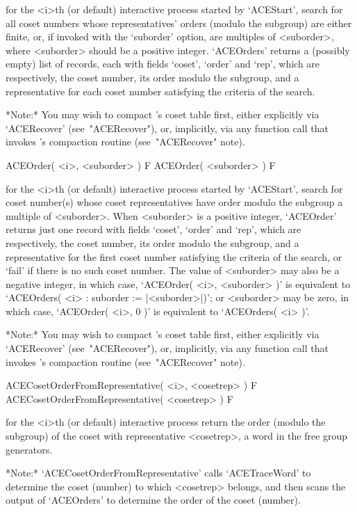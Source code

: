 for the <i>th (or  default)  interactive  {\ACE}  process  started  by
`ACEStart', search for all coset numbers whose representatives' orders
(modulo the subgroup) are either  finite,  or,  if  invoked  with  the
`suborder' option,  are  multiples  of  <suborder>,  where  <suborder>
should be a positive integer. `ACEOrders' returns a  (possibly  empty)
list of records, each with fields `coset', `order'  and  `rep',  which
are respectively, the coset number, its order modulo the subgroup, and
a representative for each coset number satisfying the criteria of  the
search.

*Note:*
You may wish to compact {\ACE}'s coset table first, either  explicitly
via `ACERecover' (see~"ACERecover"), or, implicitly, via any  function
call that invokes {\ACE}'s compaction routine (see~"ACERecover" note).

\>ACEOrder( <i>, <suborder> ) F
\>ACEOrder( <suborder> ) F

for the <i>th (or  default)  interactive  {\ACE}  process  started  by
`ACEStart', search for coset  number(s)  whose  coset  representatives
have  order  modulo  the  subgroup  a  multiple  of  <suborder>.  When
<suborder> is a positive integer, `ACEOrder' returns just  one  record
with fields `coset', `order' and `rep', which  are  respectively,  the
coset number, its order modulo the subgroup, and a representative  for
the first coset number satisfying  the  criteria  of  the  search,  or
`fail' if there is no such coset number. The value of  <suborder>  may
also be a negative integer, in which case, `ACEOrder( <i>,  <suborder>
)' is equivalent to `ACEOrders( <i> : suborder :=  |<suborder>|)';  or
<suborder> may be zero,  in  which  case,  `ACEOrder(  <i>,  0  )'  is
equivalent to `ACEOrders( <i> )'.

*Note:*
You may wish to compact {\ACE}'s coset table first, either  explicitly
via `ACERecover' (see~"ACERecover"), or, implicitly, via any  function
call that invokes {\ACE}'s compaction routine (see~"ACERecover" note).

\>ACECosetOrderFromRepresentative( <i>, <cosetrep> ) F
\>ACECosetOrderFromRepresentative( <cosetrep> ) F

for the <i>th (or default) interactive {\ACE} process return the order
(modulo the subgroup) of the coset with representative  <cosetrep>,  a
word in the free group generators.

*Note:*   
`ACECosetOrderFromRepresentative' calls  `ACETraceWord'  to  determine
the coset (number) to which <cosetrep> belongs,  and  then  scans  the
output of `ACEOrders' to determine the order of the coset (number).

